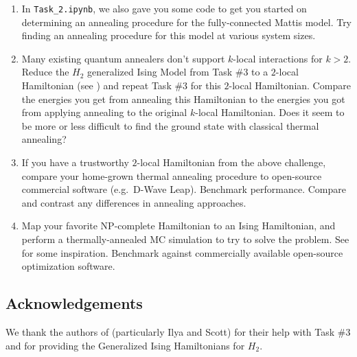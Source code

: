 \documentclass[12pt]{article}
\begin{document}
\begin{enumerate}
    \item In \texttt{Task\_2.ipynb}, we also gave you some code to get you started on determining
          an annealing procedure for the fully-connected Mattis model. Try finding an annealing
          procedure for this model at various system sizes.

    \item Many existing quantum annealers don't support $k$-local interactions for $k > 2$.
          Reduce the $H_2$ generalized Ising Model from Task \#3 to a $2$-local Hamiltonian
          (see \cite{xia2017electronic}) and repeat Task \#3 for this $2$-local Hamiltonian.
          Compare the energies you get from annealing this Hamiltonian to the energies
          you got from applying annealing to the original $k$-local Hamiltonian. Does it seem to
          be more or less difficult to find the ground state with classical thermal annealing?

    \item If you have a trustworthy $2$-local Hamiltonian from the above challenge, compare your home-grown
        thermal annealing procedure to open-source commercial software (e.g.~D-Wave Leap).  Benchmark
        performance.  Compare and contrast any differences in annealing approaches.

    \item Map your favorite NP-complete Hamiltonian to an Ising Hamiltonian, and perform
          a thermally-annealed MC simulation to try to solve the problem. See \cite{ising_np} for some
          inspiration. Benchmark against commercially available open-source optimization software.

\end{enumerate}

\subsection*{Acknowledgements}\label{sec:acknowledgements}
We thank the authors of \cite{iqcc} (particularly Ilya and Scott) for their help with Task \#3 and for
providing the Generalized Ising Hamiltonians for $H_2$.

\newpage

\nocite{*}


\end{document}
